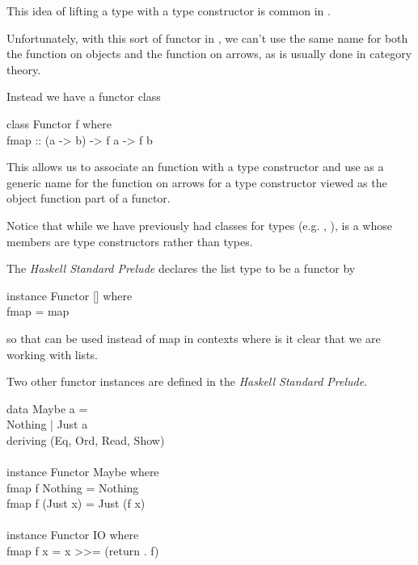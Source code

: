 \documentclass{seminar}
\newcommand{\vs}{\vspace{0.3in}}
\begin{document}
\begin{slide}
This idea of lifting a type with a type constructor is common in
\Has.

Unfortunately, with this sort of functor in \Has,
we can't use the same name for both the function on objects and the
function on arrows, as is usually done in category theory.

Instead we have a functor class

\begin{code}
class Functor f where\\
\> fmap :: (a -> b) -> f a -> f b
\end{code}

This allows us to associate an  function with a type
constructor
and use  as a generic name for the function on arrows for
a
type constructor viewed as the object function part of a functor.

\vs

Notice that while we have previously had classes for types (e.g.
,
),  is a  whose
members
are type constructors rather than types.

\newslide

The \textit{Haskell Standard Prelude} declares the list type to be a functor
by

\begin{code}
instance Functor [] where\\
\> fmap = map
\end{code}

so that  can be used instead of map in contexts where is
it
clear that we are working with lists.

\newslide

Two other functor instances are defined in the \textit{Haskell Standard
Prelude}.

\begin{code}
data Maybe a =\\
\> Nothing | Just a\\
\> \> deriving (Eq, Ord, Read, Show)\\
\\
instance Functor Maybe where\\
\> fmap f Nothing = Nothing\\
\> fmap f (Just x) = Just (f x)\\
\\
instance Functor IO where\\
\> fmap f x = x >>= (return . f)
\end{code}


\end{slide}
\end{document}

